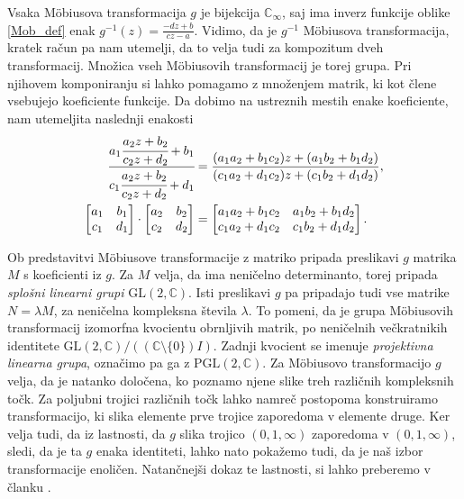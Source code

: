 \documentclass[a4paper,12pt]{article}
\def\C{\mathbb{C}} %
\def\Ci{\mathbb{C}_{\infty}} %
\begin{document}
Vsaka M\"obiusova transformacija $g$ je bijekcija $\Ci$, saj ima inverz funkcije oblike \eqref{Mob_def} enak $g^{-1}(z) = \frac{-dz + b}{cz - a}$. Vidimo, da je $g^{-1}$ M\"obiusova transformacija, kratek račun pa nam utemelji, da to velja tudi za kompozitum dveh transformacij. Množica vseh M\"obiusovih transformacij je torej grupa. Pri njihovem komponiranju si lahko pomagamo z množenjem matrik, ki kot člene vsebujejo koeficiente funkcije. Da dobimo na ustreznih mestih enake koeficiente, nam utemeljita naslednji enakosti
\begin{align*}
    \cfrac{a_1\cfrac{a_2z + b_2}{c_2z + d_2} + b_1}{c_1\cfrac{a_2z + b_2}{c_2z + d_2} + d_1} &= \frac{(a_1a_2 + b_1c_2)z + (a_1b_2 + b_1d_2)}{(c_1a_2 + d_1c_2)z + (c_1b_2+d_1d_2)},
    \\
    \begin{bmatrix}
        a_1 & b_1\\
        c_1 & d_1
    \end{bmatrix}
    \cdot
    \begin{bmatrix}
        a_2 & b_2\\
        c_2 & d_2
    \end{bmatrix}
    &=
    \begin{bmatrix}
        a_1a_2 + b_1c_2 & a_1b_2 + b_1d_2\\
        c_1a_2 + d_1c_2 & c_1b_2+d_1d_2
    \end{bmatrix}.
\end{align*}

Ob predstavitvi M\"obiusove transformacije z matriko pripada preslikavi $g$ matrika $M$ s koeficienti iz $g$. Za $M$ velja, da ima neničelno determinanto, torej pripada \emph{splošni linearni grupi} $\text{GL}(2, \C)$. Isti preslikavi $g$ pa pripadajo tudi vse matrike $N = \lambda M$, za neničelna kompleksna števila $\lambda$. To pomeni, da je grupa M\"obiusovih transformacij izomorfna kvocientu obrnljivih matrik, po neničelnih večkratnikih identitete $\text{GL}(2, \C) / ((\C \setminus \{0\})I)$. Zadnji kvocient se imenuje \emph{projektivna linearna grupa}, označimo pa ga z $\text{PGL}(2, \C)$. Za M\"obiusovo transformacijo $g$ velja, da je natanko določena, ko poznamo njene slike treh različnih kompleksnih točk. Za poljubni trojici različnih točk lahko namreč postopoma konstruiramo transformacijo, ki slika elemente prve trojice zaporedoma v elemente druge. Ker velja tudi, da iz lastnosti, da $g$ slika trojico $(0, 1, \infty)$ zaporedoma v $(0, 1, \infty)$, sledi, da je ta $g$ enaka identiteti, lahko nato pokažemo tudi, da je naš izbor transformacije enoličen. Natančnejši dokaz te lastnosti, si lahko preberemo v članku \cite{Schwartz}.
\end{document}

